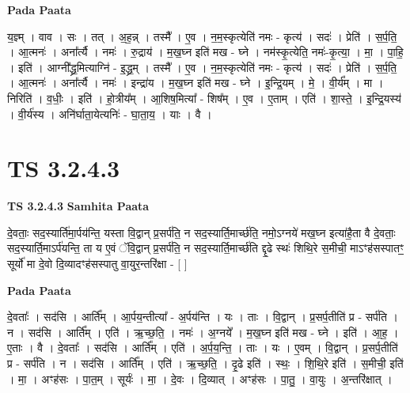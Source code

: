\documentclass[17pt]{extarticle}
\begin{document}
\textbf{Pada Paata} \newline

य॒ज्ञ्म् । वाव । सः । तत् । अ॒ह॒न्न् । तस्मै᳚ । ए॒व । न॒म॒स्कृत्येति॑ नमः - कृत्य॑ । सदः॑ । प्रेति॑ । स॒र्प॒ति॒ । आ॒त्मनः॑ । अना᳚र्त्यै । नमः॑ । रु॒द्राय॑ । म॒ख॒घ्न इति॑ मख - घ्ने । नम॑स्कृ॒त्येति॒ नमः॑-कृ॒त्या॒ । मा॒ । पा॒हि॒ । इति॑ । आग्नी᳚द्ध्र॒मित्याग्नि॑ - इ॒द्ध्र॒म् । तस्मै᳚ । ए॒व । न॒म॒स्कृत्येति॑ नमः - कृत्य॑ । सदः॑ । प्रेति॑ । स॒र्प॒ति॒ । आ॒त्मनः॑ । अना᳚र्त्यै । नमः॑ । इन्द्रा॑य । म॒ख॒घ्न इति॑ मख - घ्ने । इ॒न्द्रि॒यम् । मे॒ । वी॒र्य᳚म् । मा । निरिति॑ । व॒धीः॒ । इति॑ । हो॒त्रीय᳚म् । आ॒शिष॒मित्या᳚ - शिष᳚म् । ए॒व । ए॒ताम् । एति॑ । शा॒स्ते॒ । इ॒न्द्रि॒यस्य॑ । वी॒र्य॑स्य । अनि॑र्घाता॒येत्यनिः॑ - घा॒ता॒य॒ । याः । वै ।  \newline




\section*{ TS 3.2.4.3 }

\textbf{TS 3.2.4.3 } \newline
\textbf{Samhita Paata} \newline

दे॒वताः॒ सद॒स्यार्ति॑मा॒र्पय॑न्ति॒ यस्ता वि॒द्वान् प्र॒सर्प॑ति॒ न सद॒स्यार्ति॒मार्च्छ॑ति॒ नमो॒ऽग्नये॑ मख॒घ्न इत्या॑है॒ता वै दे॒वताः॒ सद॒स्यार्ति॒माऽर्प॑यन्ति॒ ता य ए॒वं ॅवि॒द्वान् प्र॒सर्प॑ति॒ न सद॒स्यार्ति॒मार्च्छ॑ति द्दृ॒ढे स्थः॑ शिथि॒रे स॒मीची॒ माऽꣳह॑सस्पातꣳ॒॒ सूर्यो॑ मा दे॒वो दि॒व्यादꣳह॑सस्पातु वा॒युर॒न्तरि॑क्षा - [  ] \newline

\textbf{Pada Paata} \newline

दे॒वताः᳚ । सद॑सि । आर्ति᳚म् । आ॒र्पय॒न्तीत्या᳚ - अ॒र्पय॑न्ति । यः । ताः । वि॒द्वान् । प्र॒सर्प॒तीति॑ प्र - सर्प॑ति । न । सद॑सि । आर्ति᳚म् । एति॑ । ऋ॒च्छ॒ति॒ । नमः॑ । अ॒ग्नये᳚ । म॒ख॒घ्न इति॑ मख - घ्ने । इति॑ । आ॒ह॒ । ए॒ताः । वै । दे॒वताः᳚ । सद॑सि । आर्ति᳚म् । एति॑ । अ॒र्प॒य॒न्ति॒ । ताः । यः । ए॒वम् । वि॒द्वान् । प्र॒सर्प॒तीति॑ प्र - सर्प॑ति । न । सद॑सि । आर्ति᳚म् । एति॑ । ऋ॒च्छ॒ति॒ । दृ॒ढे इति॑ । स्थः॒ । शि॒थि॒रे इति॑ । स॒मीची॒ इति॑ । मा॒ । अꣳह॑सः । पा॒त॒म् । सूर्यः॑ । मा॒ । दे॒वः । दि॒व्यात् । अꣳह॑सः । पा॒तु॒ । वा॒युः । अ॒न्तरि॑क्षात् ।  \newline




\end{document}

